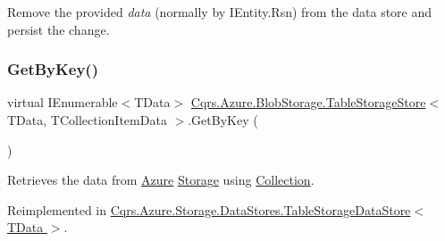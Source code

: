 Remove the provided {\itshape data}  (normally by I\+Entity.\+Rsn) from the data store and persist the change. 

\mbox{\label{classCqrs_1_1Azure_1_1BlobStorage_1_1TableStorageStore_a7a6e253d7d4f6d40a2b59e804f68c5c4_a7a6e253d7d4f6d40a2b59e804f68c5c4}} 
\subsubsection{\texorpdfstring{Get\+By\+Key()}{GetByKey()}}
{\footnotesize\ttfamily virtual I\+Enumerable$<$T\+Data$>$ \hyperlink{classCqrs_1_1Azure_1_1BlobStorage_1_1TableStorageStore}{Cqrs.\+Azure.\+Blob\+Storage.\+Table\+Storage\+Store}$<$ T\+Data, T\+Collection\+Item\+Data $>$.Get\+By\+Key (\begin{DoxyParamCaption}{ }\end{DoxyParamCaption})\hspace{0.3cm}{\ttfamily [virtual]}}



Retrieves the data from \hyperlink{namespaceCqrs_1_1Azure}{Azure} \hyperlink{namespaceCqrs_1_1Azure_1_1Storage}{Storage} using \hyperlink{classCqrs_1_1Azure_1_1BlobStorage_1_1TableStorageStore_a97752ec9c5ad130a230924da9a75a537_a97752ec9c5ad130a230924da9a75a537}{Collection}. 



Reimplemented in \hyperlink{classCqrs_1_1Azure_1_1Storage_1_1DataStores_1_1TableStorageDataStore_a79043a9d497f4027cf87e5ff78fe6098_a79043a9d497f4027cf87e5ff78fe6098}{Cqrs.\+Azure.\+Storage.\+Data\+Stores.\+Table\+Storage\+Data\+Store$<$ T\+Data $>$}.

\mbox{\label{classCqrs_1_1Azure_1_1BlobStorage_1_1TableStorageStore_ab7c4ae1a7b13e6bd1c36c242b753edba_ab7c4ae1a7b13e6bd1c36c242b753edba}} 
